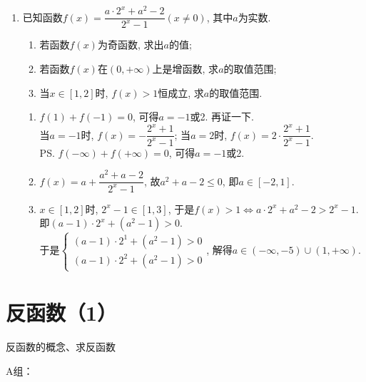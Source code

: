 \begin{enumerate}
\item 已知函数$f(x)=\dfrac{a\cdot2^x+a^2-2}{2^x-1}(x\neq0)$, 其中$a$为实数. 
\begin{enumerate}[(1)]
\item 若函数$f(x)$为奇函数, 求出$a$的值;
\item 若函数$f(x)$在$(0,+\infty )$上是增函数, 求$a$的取值范围;
\item 当$x\in\left[1,2\right]$时, $f(x)>1$恒成立, 求$a$的取值范围. 
\end{enumerate}
\begin{jieda}
\begin{enumerate}
\item $f(1)+f(-1)=0$, 可得$a=-1$或2. 再证一下. \\
当$a=-1$时, $f(x)=-\dfrac{2^x+1}{2^x-1}$; 当$a=2$时, $f(x)=2\cdot\dfrac{2^x+1}{2^x-1}$. \\
\ps $f(-\infty)+f(+\infty)=0$, 可得$a=-1$或2. 

\item $f(x)=a+\dfrac{a^2+a-2}{2^x-1}$, 故$a^2+a-2\leq 0$, 即$a\in[-2,1]$. 

\item $x\in\left[1,2\right]$时, $2^x-1\in[1,3]$, 于是$f(x)>1\iff a\cdot2^x+a^2-2>2^x-1$. \\
即$(a-1)\cdot 2^x+(a^2-1)>0$. \\
于是$\begin{cases}
(a-1)\cdot 2^1+(a^2-1)>0\\
(a-1)\cdot 2^2+(a^2-1)>0
\end{cases}$, 解得$a\in(-\infty,-5)\cup(1,+\infty)$. 
\end{enumerate}
\end{jieda}


\end{enumerate}


\section{反函数（1）}
\zsd 反函数的概念、求反函数

A组：

